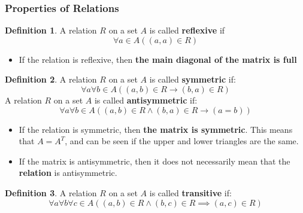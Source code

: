 \documentclass[article, 12pt]{article}
\theoremstyle{definition}
\newtheorem{definition}{Definition}
\begin{document}
    \subsubsection{Properties of Relations}
    \begin{definition}\label{def:reflexive}
        A relation $R$ on a set $A$ is called \textbf{reflexive} if
            \[ \forall a \in A((a,a) \in R) \]
    \end{definition}
    \begin{itemize}
        \item If the relation is reflexive, then \textbf{the main diagonal of the matrix is full}
    \end{itemize}
    \begin{definition}\label{def:symmetric and antisymmetric}
        A relation $R$ on a set $A$ is called \textbf{symmetric} if:
            \[ \forall a \forall b \in A((a,b) \in R \rightarrow (b,a) \in R) \]
        A relation $R$ on a set $A$ is called \textbf{antisymmetric} if:
            \[ \forall a \forall b \in A((a,b) \in R \land (b,a) \in R \rightarrow (a=b)) \]
    \end{definition}
    \begin{itemize}
        \item If the relation is symmetric, then \textbf{the matrix is symmetric}. This means that $A = A^T$, and can be seen if the upper and lower triangles are the same.
        \item If the matrix is antisymmetric, then it does not necessarily mean that the \textbf{relation} is antisymmetric.
    \end{itemize} 
    \begin{definition}
    \label{def:transitive}
        A relation $R$ on a set $A$ is called \textbf{transitive} if:
            \[ \forall a \forall b \forall c \in A((a,b) \in R \land (b,c) \in R \implies (a,c) \in R) \]
    \end{definition}
\end{document}
